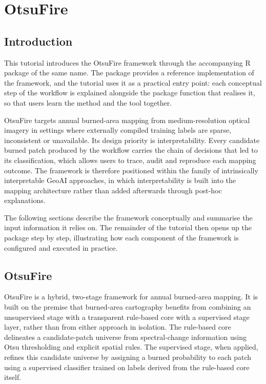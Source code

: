 \documentclass[
  british,
  a4paper,
]{scrbook}
\begin{document}
\chapter{OtsuFire}\label{otsufire}

\section{Introduction}\label{introduction}

This tutorial introduces the OtsuFire framework through the accompanying
R package of the same name. The package provides a reference
implementation of the framework, and the tutorial uses it as a practical
entry point: each conceptual step of the workflow is explained alongside
the package function that realises it, so that users learn the method
and the tool together.

OtsuFire targets annual burned-area mapping from medium-resolution
optical imagery in settings where externally compiled training labels
are sparse, inconsistent or unavailable. Its design priority is
interpretability. Every candidate burned patch produced by the workflow
carries the chain of decisions that led to its classification, which
allows users to trace, audit and reproduce each mapping outcome. The
framework is therefore positioned within the family of intrinsically
interpretable GeoAI approaches, in which interpretability is built into
the mapping architecture rather than added afterwards through post-hoc
explanations.

The following sections describe the framework conceptually and summarise
the input information it relies on. The remainder of the tutorial then
opens up the package step by step, illustrating how each component of
the framework is configured and executed in practice.

\section{OtsuFire}\label{otsufire-1}

OtsuFire is a hybrid, two-stage framework for annual burned-area
mapping. It is built on the premise that burned-area cartography
benefits from combining an unsupervised stage with a transparent
rule-based core with a supervised stage layer, rather than from either
approach in isolation. The rule-based core delineates a candidate-patch
universe from spectral-change information using Otsu thresholding and
explicit spatial rules. The supervised stage, when applied, refines this
candidate universe by assigning a burned probability to each patch using
a supervised classifier trained on labels derived from the rule-based
core itself.
\end{document}
